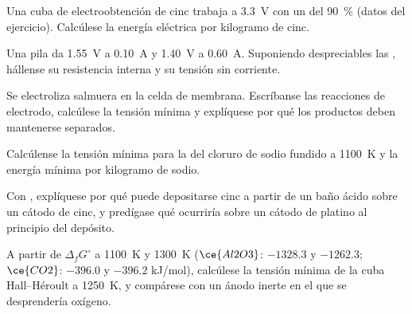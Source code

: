 \begin{exercise}[$\star\star$]\label{exo:b2:batteries-electrolysis:6}
Una cuba de electroobtención de cinc trabaja a \qty{3.3}{V} con un  del
90~\% (datos del ejercicio). Calcúlese la energía eléctrica por kilogramo de cinc.
\end{exercise}

\begin{exercise}[$\star\star$]\label{exo:b2:batteries-electrolysis:7}
Una pila da \qty{1.55}{V} a \qty{0.10}{A} y \qty{1.40}{V} a \qty{0.60}{A}.
Suponiendo despreciables las , hállense su resistencia interna y su
tensión sin corriente.
\end{exercise}

\begin{exercise}[$\star\star$]\label{exo:b2:batteries-electrolysis:8}
Se electroliza salmuera en la celda de membrana. Escríbanse las reacciones de electrodo,
calcúlese la tensión mínima y explíquese por qué los productos deben mantenerse
separados.
\end{exercise}

\begin{exercise}[$\star\star$]\label{exo:b2:batteries-electrolysis:9}
Calcúlense la tensión mínima para la  del cloruro de sodio fundido a
\qty{1100}{K} y la energía mínima por kilogramo de sodio.
\end{exercise}

\begin{exercise}[$\star\star\star$]\label{exo:b2:batteries-electrolysis:10}
Con , explíquese por qué puede depositarse cinc a partir de un baño ácido
sobre un cátodo de cinc, y predígase qué ocurriría sobre un cátodo de platino al
principio del depósito.
\end{exercise}

\begin{exercise}[$\star\star\star$]\label{exo:b2:batteries-electrolysis:11}
A partir de $\Delta_f G^\circ$ a \qty{1100}{K} y \qty{1300}{K} ($\ce{Al2O3}$: $-1328.3$ y
$-1262.3$; $\ce{CO2}$: $-396.0$ y $-396.2$ \unit{kJ/mol}), calcúlese la tensión
mínima de la cuba Hall--Héroult a \qty{1250}{K}, y compárese con un
ánodo inerte en el que se desprendería oxígeno.
\end{exercise}

